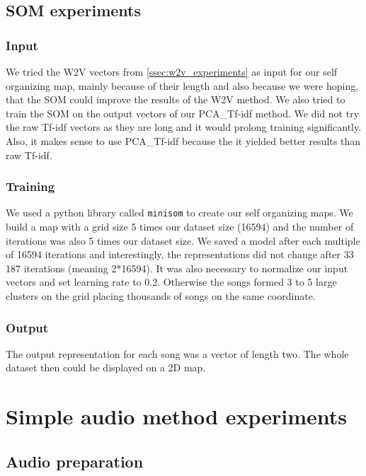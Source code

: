 \subsection{SOM experiments}

\subsubsection{Input}
We tried the W2V vectors from \ref{ssec:w2v_experiments} as input for our self organizing map, mainly because of their length and also because we were hoping, that the SOM could improve the results of the W2V method. We also tried to train the SOM on the output vectors of our PCA\_Tf-idf method. We did not try the raw Tf-idf vectors as they are long and it would prolong training significantly. Also, it makes sense to use PCA\_Tf-idf because the it yielded better results than raw Tf-idf.

\subsubsection{Training}
We used a python library called \texttt{minisom} \cite{Vettigli2019} to create our self organizing maps. We build a map with a grid size 5 times our dataset size (16594) and the number of iterations was also 5 times our dataset size. We saved a model after each multiple of 16594 iterations and interestingly, the representations did not change after 33 187 iterations (meaning 2*16594). It was also necessary to normalize our input vectors and set learning rate to 0.2. Otherwise the songs formed 3 to 5 large clusters on the grid placing thousands of songs on the same coordinate. 

\subsubsection{Output}
The output representation for each song was a vector of length two. The whole dataset then could be displayed on a 2D map. 

\section{Simple audio method experiments}

\subsection{Audio preparation}\label{ssec:audio_prep}

